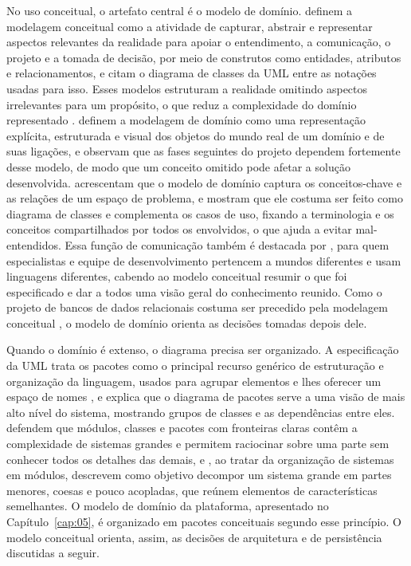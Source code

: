 No uso conceitual, o artefato central é o modelo de domínio.  definem a modelagem conceitual como a atividade de capturar, abstrair e
representar aspectos relevantes da realidade para apoiar o entendimento, a comunicação, o projeto e a tomada de decisão, por meio de construtos como entidades,
atributos e relacionamentos, e citam o diagrama de classes da UML entre as notações usadas para isso. Esses modelos estruturam a realidade omitindo aspectos
irrelevantes para um propósito, o que reduz a complexidade do domínio representado \cite{Storey2023}.  definem a modelagem de domínio
como uma representação explícita, estruturada e visual dos objetos do mundo real de um domínio e de suas ligações, e observam que as fases seguintes do projeto
dependem fortemente desse modelo, de modo que um conceito omitido pode afetar a solução desenvolvida.  acrescentam que o modelo de domínio
captura os conceitos-chave e as relações de um espaço de problema, e  mostram que ele costuma ser feito como diagrama de classes e
complementa os casos de uso, fixando a terminologia e os conceitos compartilhados por todos os envolvidos, o que ajuda a evitar mal-entendidos. Essa função de
comunicação também é destacada por , para quem especialistas e equipe de desenvolvimento pertencem a mundos diferentes e usam
linguagens diferentes, cabendo ao modelo conceitual resumir o que foi especificado e dar a todos uma visão geral do conhecimento reunido. Como o projeto de
bancos de dados relacionais costuma ser precedido pela modelagem conceitual \cite{Storey2023}, o modelo de domínio orienta as decisões tomadas depois dele.

Quando o domínio é extenso, o diagrama precisa ser organizado. A especificação da UML trata os pacotes como o principal recurso genérico de estruturação e
organização da linguagem, usados para agrupar elementos e lhes oferecer um espaço de nomes \cite{OMG2017uml}, e
 explica que o diagrama de pacotes serve a uma visão de mais alto nível do sistema, mostrando grupos de classes e as
dependências entre eles.  defendem que módulos, classes e pacotes com fronteiras claras contêm a complexidade de sistemas grandes e
permitem raciocinar sobre uma parte sem conhecer todos os detalhes das demais, e , ao tratar da organização de sistemas em módulos,
descrevem como objetivo decompor um sistema grande em partes menores, coesas e pouco acopladas, que reúnem elementos de características semelhantes. O modelo
de domínio da plataforma, apresentado no Capítulo~\ref{cap:05}, é organizado em pacotes conceituais segundo esse princípio. O modelo conceitual orienta, assim,
as decisões de arquitetura e de persistência discutidas a seguir.


